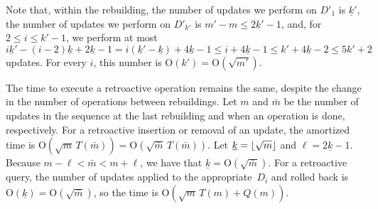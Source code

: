 \documentclass[reqno,11pt]{amsart}
\DeclarePairedDelimiter\ceil{\lceil}{\rceil}
\DeclarePairedDelimiter\floor{\lfloor}{\rfloor}
\newcommand{\Oh}{\mathrm{O}}
\begin{document}
Note that, within the rebuilding, 
the number of updates we perform on $D'_1$ is $\underline{k}'$, 
the number of updates we perform on $D'_{k'}$ is $m'-m \leq 2\underline{k}'-1$, 
and, for $2 \leq i \leq k'-1$, we perform at most 
$i\underline{k}' - (i-2)\underline{k}+2\underline{k}-1
 = i(\underline{k}'-\underline{k})+4\underline{k}-1 
\leq i+4\underline{k}-1 \leq k'+4\underline{k}-2 \leq 5k'+2$ updates. 
For every $i$, this number is $\Oh(k') = \Oh(\sqrt{m'})$.


The time to execute a retroactive operation remains the same, 
despite the change in the number of operations between rebuildings.
Let $m$ and $\bar{m}$ be the number of updates in the sequence at 
the last rebuilding and when an operation is done, respectively.
For a retroactive insertion or removal of an update, the amortized time 
is $\Oh(\sqrt{m}\,T(\bar{m})) = \Oh(\sqrt{\bar{m}}\,T(\bar{m}))$.  
Let $\underline{k} = \floor{\sqrt{m}}$ and $\ell = 2\underline{k}-1$. 
Because $m-\ell < \bar{m} < m+\ell$, we have that $\underline{k} = \Oh(\sqrt{\bar{m}})$. 
For a retroactive query, the number of updates applied to the 
appropriate~$D_i$ and rolled back is $\Oh(\underline{k}) = \Oh(\sqrt{\bar{m}})$, 
so the time is $\Oh(\sqrt{m}\,T(m)+Q(m))$.  


\end{document}
